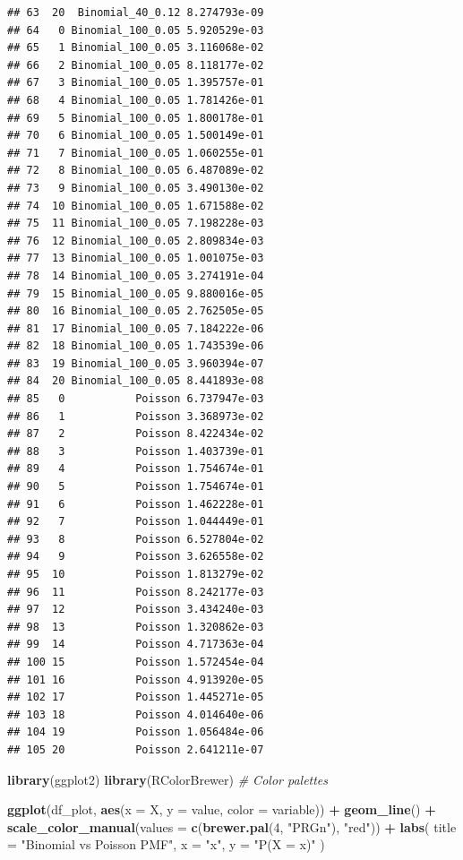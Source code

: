 \documentclass[
]{article}
\newenvironment{Shaded}{\begin{snugshade}}{\end{snugshade}}
\newcommand{\CommentTok}[1]{\textcolor[rgb]{0.56,0.35,0.01}{\textit{#1}}}
\newcommand{\DataTypeTok}[1]{\textcolor[rgb]{0.13,0.29,0.53}{#1}}
\newcommand{\DecValTok}[1]{\textcolor[rgb]{0.00,0.00,0.81}{#1}}
\newcommand{\KeywordTok}[1]{\textcolor[rgb]{0.13,0.29,0.53}{\textbf{#1}}}
\newcommand{\NormalTok}[1]{#1}
\newcommand{\OperatorTok}[1]{\textcolor[rgb]{0.81,0.36,0.00}{\textbf{#1}}}
\newcommand{\StringTok}[1]{\textcolor[rgb]{0.31,0.60,0.02}{#1}}
\begin{document}
\begin{verbatim}
## 63  20  Binomial_40_0.12 8.274793e-09
## 64   0 Binomial_100_0.05 5.920529e-03
## 65   1 Binomial_100_0.05 3.116068e-02
## 66   2 Binomial_100_0.05 8.118177e-02
## 67   3 Binomial_100_0.05 1.395757e-01
## 68   4 Binomial_100_0.05 1.781426e-01
## 69   5 Binomial_100_0.05 1.800178e-01
## 70   6 Binomial_100_0.05 1.500149e-01
## 71   7 Binomial_100_0.05 1.060255e-01
## 72   8 Binomial_100_0.05 6.487089e-02
## 73   9 Binomial_100_0.05 3.490130e-02
## 74  10 Binomial_100_0.05 1.671588e-02
## 75  11 Binomial_100_0.05 7.198228e-03
## 76  12 Binomial_100_0.05 2.809834e-03
## 77  13 Binomial_100_0.05 1.001075e-03
## 78  14 Binomial_100_0.05 3.274191e-04
## 79  15 Binomial_100_0.05 9.880016e-05
## 80  16 Binomial_100_0.05 2.762505e-05
## 81  17 Binomial_100_0.05 7.184222e-06
## 82  18 Binomial_100_0.05 1.743539e-06
## 83  19 Binomial_100_0.05 3.960394e-07
## 84  20 Binomial_100_0.05 8.441893e-08
## 85   0           Poisson 6.737947e-03
## 86   1           Poisson 3.368973e-02
## 87   2           Poisson 8.422434e-02
## 88   3           Poisson 1.403739e-01
## 89   4           Poisson 1.754674e-01
## 90   5           Poisson 1.754674e-01
## 91   6           Poisson 1.462228e-01
## 92   7           Poisson 1.044449e-01
## 93   8           Poisson 6.527804e-02
## 94   9           Poisson 3.626558e-02
## 95  10           Poisson 1.813279e-02
## 96  11           Poisson 8.242177e-03
## 97  12           Poisson 3.434240e-03
## 98  13           Poisson 1.320862e-03
## 99  14           Poisson 4.717363e-04
## 100 15           Poisson 1.572454e-04
## 101 16           Poisson 4.913920e-05
## 102 17           Poisson 1.445271e-05
## 103 18           Poisson 4.014640e-06
## 104 19           Poisson 1.056484e-06
## 105 20           Poisson 2.641211e-07
\end{verbatim}

\begin{Shaded}
\begin{Highlighting}[]
\KeywordTok{library}\NormalTok{(ggplot2)}
\KeywordTok{library}\NormalTok{(RColorBrewer) }\CommentTok{\# Color palettes}

\KeywordTok{ggplot}\NormalTok{(df\_plot, }\KeywordTok{aes}\NormalTok{(}\DataTypeTok{x =}\NormalTok{ X, }\DataTypeTok{y =}\NormalTok{ value, }\DataTypeTok{color =}\NormalTok{ variable)) }\OperatorTok{+}
\StringTok{  }\KeywordTok{geom\_line}\NormalTok{() }\OperatorTok{+}
\StringTok{  }\KeywordTok{scale\_color\_manual}\NormalTok{(}\DataTypeTok{values =} \KeywordTok{c}\NormalTok{(}\KeywordTok{brewer.pal}\NormalTok{(}\DecValTok{4}\NormalTok{, }\StringTok{"PRGn"}\NormalTok{), }\StringTok{"red"}\NormalTok{)) }\OperatorTok{+}
\StringTok{  }\KeywordTok{labs}\NormalTok{(}
    \DataTypeTok{title =} \StringTok{"Binomial vs Poisson PMF"}\NormalTok{,}
    \DataTypeTok{x =} \StringTok{"x"}\NormalTok{,}
    \DataTypeTok{y =} \StringTok{"P(X = x)"}
\NormalTok{  )}
\end{Highlighting}
\end{Shaded}
\end{document}
